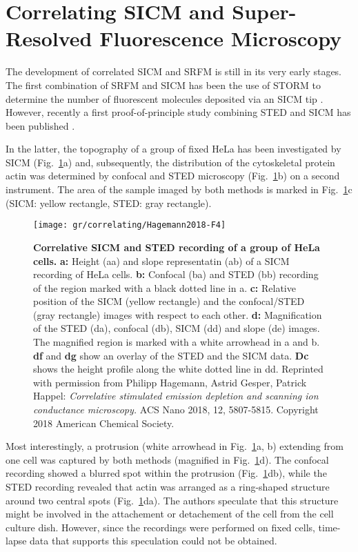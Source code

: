 \section{Correlating SICM and Super-Resolved Fluorescence Microscopy}
\label{sec:correlating-sicm-and-srfm}

The development of correlated
SICM and SRFM is still in its very early stages. The first combination of SRFM
and SICM has been the use of STORM to determine the number of fluorescent
molecules deposited via an SICM tip \cite{Hennig2015}. However, recently a
first proof-of-principle study combining STED and SICM has been published
\cite{Hagemann2018}.

In the latter, the topography of a group of fixed HeLa has been investigated
by SICM (Fig.~\ref{fig:SICM_STED1}a) and, subsequently, the distribution of
the cytoskeletal protein actin was determined by confocal and STED microscopy
(Fig.~\ref{fig:SICM_STED1}b) on a second instrument. The area of the sample
imaged by both methods is marked in Fig.~\ref{fig:SICM_STED1}c (SICM: yellow
rectangle, STED: gray rectangle).



\begin{figure}	
  \centering
    \texttt{[image: gr/correlating/Hagemann2018-F4]}
      \caption{
      \textbf{Correlative SICM and STED recording of a group of HeLa cells.} 
      \textbf{a:} Height (aa) and slope representatin (ab) of a SICM recording
      of HeLa cells. \textbf{b:} Confocal (ba) and STED (bb) recording of the
      region marked  
      with a black dotted line in a. \textbf{c:}  Relative position of 
      the SICM (yellow rectangle) and the confocal/STED (gray rectangle)
      images with respect to  each 
      other. \textbf{d:} Magnification of the STED (da), confocal  (db), SICM
      (dd) and slope (de) images. The magnified region is marked with a white 
      arrowhead in a and b. \textbf{df} and \textbf{dg} show an overlay of 
      the STED and the SICM data. 
      \textbf{Dc} shows the height profile along the white dotted line in dd.  Reprinted 
      with permission from Philipp Hagemann, Astrid Gesper, Patrick Happel: \emph{Correlative 
      stimulated emission depletion and scanning ion conductance microscopy.} ACS Nano 2018, 
      12, 5807-5815. Copyright 2018 American Chemical Society.}
  \label{fig:SICM_STED1}
\end{figure}

Most interestingly, a protrusion (white arrowhead in
Fig.~\ref{fig:SICM_STED1}a, b) extending from one cell was captured by both
methods (magnified in Fig.~\ref{fig:SICM_STED1}d). The confocal recording
showed a blurred spot within the protrusion (Fig.~\ref{fig:SICM_STED1}db),
while the STED recording revealed that actin was arranged as a ring-shaped
structure around two central spots (Fig.~\ref{fig:SICM_STED1}da). The authors
speculate that this structure might be involved in the attachement or
detachement of the cell from the cell culture dish. However, since the
recordings were performed on fixed cells, time-lapse data that supports this
speculation could not be obtained.

